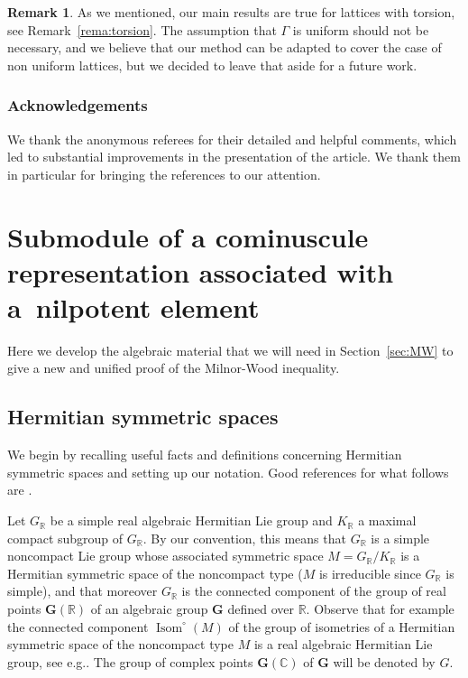\documentclass[10pt]{amsart}
\let\cites\cite
\newcommand{\citestar}[3]{\cite[#3]{#1}}
\theoremstyle{plain}
\theoremstyle{definition}
\newtheorem*{rema*}{Remark}
\DeclareMathOperator{\Isom}{Isom}
\newcommand{\bC}{\mathbb{C}}
\newcommand{\bR}{\mathbb{R}}
\newcommand{\bfG}{\boldsymbol{G}}
\providecommand{\eg}{e.g.}\providecommand{\ie}{i.e.}\providecommand{\etc}{etc.}\providecommand{\resp}{resp.}\providecommand{\cf}{cf.}
\begin{document}
\begin{rema*}
As we mentioned, our main results are true for lattices with torsion, see Remark~\ref{rema:torsion}.
The assumption that $\Gamma$ is uniform should not be necessary,
and we believe that our method can be adapted to cover the case of non uniform lattices, but we
decided to leave that aside for a future work.
\end{rema*}

\subsubsection*{Acknowledgements}
We thank the anonymous referees for their detailed and helpful
comments, which led to substantial improvements in the presentation of the article. We thank them in
particular for bringing the references \cites{Gross, ShengZuo} to our attention.

\section{Submodule of a cominuscule representation associated with a~nilpotent element}
\label{sec:subnil}

Here we develop the algebraic material that we will need in Section~\ref{sec:MW} to give a new and
unified proof of the Milnor-Wood inequality.

\subsection{Hermitian symmetric spaces}
\label{subsec:hermitian}

We begin by recalling useful facts and definitions concerning Hermitian symmetric spaces and setting
up our notation. Good references for what follows are \cites{WolfFineStructure,
AshMumfordRapoportTai, Helgason, Knapp}.

Let $G_\bR$ be a simple real algebraic Hermitian Lie group and $K_\bR$ a maximal compact subgroup of
$G_\bR$. By our convention, this means that
$G_\bR$ is a simple noncompact Lie group whose associated symmetric space $M=G_\bR/K_\bR$ is a Hermitian
symmetric space of the noncompact type ($M$ is irreducible
since $G_\bR$ is simple), and that moreover $G_\bR$ is the connected component of the group
of real points $\bfG(\bR)$ of an algebraic group $\bfG$ defined over $\bR$. Observe that for example the connected component
$\Isom^\circ(M)$ of the group of isometries of a Hermitian symmetric space of the noncompact type
$M$ is a real algebraic Hermitian Lie group, see \eg \citestar{AshMumfordRapoportTai}*{p.\,106}. The group of complex points $\bfG(\bC)$ of $\bfG$ will be denoted by $G$.
\end{document}
